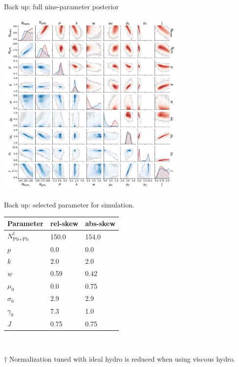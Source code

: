 \documentclass[11pt]{beamer}
\begin{document}
\begin{frame}[noframenumbering]{Back up: full nine-parameter posterior}
\begin{center}
\includegraphics[width=0.7\textwidth]{posterior.pdf}
\end{center}
\end{frame}

\begin{frame}[noframenumbering]{Back up: selected parameter for simulation.}
\begin{center}
    \begin{tabular}{lll}
      Parameter & rel-skew	& abs-skew \\
	  \hline
      $N_{\textrm{Pb+Pb}}^\dagger$   & 150.0     & 154.0  \\
      $p$	    & 0.0      & 0.0  \\
      $k$	    & 2.0     & 2.0  \\
      $w$	    & 0.59     & 0.42  \\
      $\mu_0$   & 0.0     & 0.75  \\
      $\sigma_0$ & 2.9    & 2.9  \\
   	  $\gamma_0$ & 7.3		& 1.0	\\
      $J$	     & 0.75 & 0.75	\\
    \end{tabular}\\
    \end{center}
\begin{center}
\tiny  \raggedright{$\dagger$ Normalization tuned with ideal hydro is reduced when using viscous hydro.}
\end{center}

\end{frame}
\end{document}
